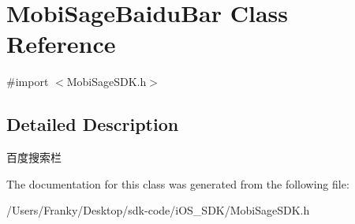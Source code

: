 \hypertarget{interface_mobi_sage_baidu_bar}{\section{\-Mobi\-Sage\-Baidu\-Bar \-Class \-Reference}
\label{interface_mobi_sage_baidu_bar}
}


{\ttfamily \#import $<$\-Mobi\-Sage\-S\-D\-K.\-h$>$}



\subsection{\-Detailed \-Description}
百度搜索栏 

\-The documentation for this class was generated from the following file\-:\begin{DoxyCompactItemize}
\item 
/\-Users/\-Franky/\-Desktop/sdk-\/code/i\-O\-S\-\_\-\-S\-D\-K/\-Mobi\-Sage\-S\-D\-K.\-h\end{DoxyCompactItemize}
